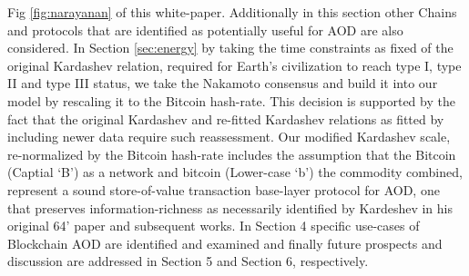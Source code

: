 \documentclass[final,5p,times,twocolumn,authoryear]{elsarticle}
\begin{document}
Fig \ref{fig:narayanan} of this white-paper. Additionally in this section other Chains and protocols that are identified as potentially useful for AOD are also considered. In Section \ref{sec:energy} by taking the time constraints as fixed of the original Kardashev relation, required for Earth's civilization to reach type I, type II and type III status,  we take the Nakamoto consensus and build it into our model by rescaling it to the Bitcoin hash-rate. This decision is supported by the fact that the original Kardashev and re-fitted Kardashev relations as fitted by including newer data require such reassessment. Our modified Kardashev scale, re-normalized by the Bitcoin hash-rate includes the assumption that the Bitcoin (Captial `B') as a network and bitcoin (Lower-case `b') the commodity combined, represent a sound store-of-value transaction base-layer protocol for AOD, one that preserves information-richness as necessarily identified by Kardeshev in his original 64' paper and subsequent works. In Section 4 specific use-cases of Blockchain AOD are identified and examined and finally future prospects and discussion are addressed in Section 5 and Section 6, respectively.


\end{document}
